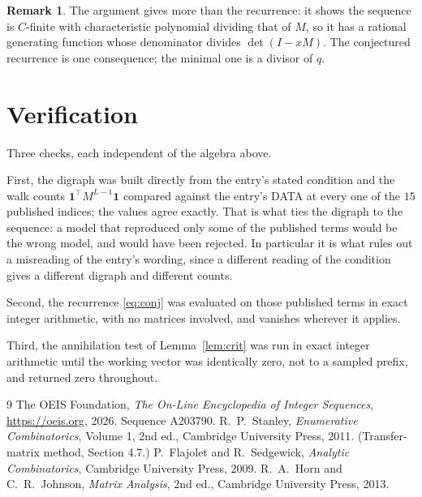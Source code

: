 \documentclass[11pt,a4paper]{article}
\theoremstyle{plain}
\theoremstyle{definition}
\newtheorem{remark}[theorem]{Remark}
\begin{document}
\begin{remark}
The argument gives more than the recurrence: it shows the sequence is $C$-finite with
characteristic polynomial dividing that of $M$, so it has a rational generating function
whose denominator divides $\det(I-xM)$. The conjectured recurrence is one consequence; the
minimal one is a divisor of $q$.
\end{remark}

\section{Verification}

Three checks, each independent of the algebra above.

First, the digraph was built directly from the entry's stated condition and the walk counts
$\mathbf{1}^{\!\top}M^{L-1}\mathbf{1}$ compared against the entry's DATA at
every one of the $15$ published indices; the values agree exactly. That is what ties
the digraph to the sequence: a model that reproduced only some of the published terms would
be the wrong model, and would have been rejected. In particular it is what rules out a
misreading of the entry's wording, since a different reading of the condition gives a
different digraph and different counts.

Second, the recurrence \eqref{eq:conj} was evaluated on those published terms in exact
integer arithmetic, with no matrices involved, and vanishes wherever it applies.

Third, the annihilation test of Lemma~\ref{lem:crit} was run in exact integer arithmetic
until the working vector was identically zero, not to a sampled prefix, and returned zero
throughout.

\begin{thebibliography}{9}
 The OEIS Foundation, \emph{The On-Line Encyclopedia of Integer
Sequences}, \url{https://oeis.org}, 2026. Sequence A203790.
 R.~P.~Stanley, \emph{Enumerative Combinatorics}, Volume 1, 2nd ed.,
Cambridge University Press, 2011. (Transfer-matrix method, Section 4.7.)
 P.~Flajolet and R.~Sedgewick, \emph{Analytic Combinatorics}, Cambridge
University Press, 2009.
 R.~A.~Horn and C.~R.~Johnson, \emph{Matrix Analysis}, 2nd ed., Cambridge
University Press, 2013.
\end{thebibliography}
\end{document}
